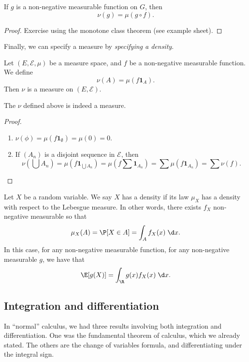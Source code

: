 \documentclass[a4paper]{article}
\begin{document}
\begin{prop}
  If $g$ is a non-negative measurable function on $G$, then
  \[
    \nu(g) = \mu(g \circ f).
  \]
\end{prop}

\begin{proof}
  Exercise using the monotone class theorem (see example sheet).
\end{proof}

Finally, we can specify a measure by \emph{specifying a density}.
\begin{defi}[Density]
  Let $(E, \mathcal{E}, \mu)$ be a measure space, and $f$ be a non-negative measurable function. We define
  \[
    \nu(A) = \mu(f \mathbf{1}_A)
  .\]
  Then $\nu$ is a measure on $(E, \mathcal{E})$.
\end{defi}

\begin{prop}
  The $\nu$ defined above is indeed a measure.
\end{prop}

\begin{proof}\leavevmode
  \begin{enumerate}
    \item $\nu(\phi) = \mu(f\mathbf{1}_\emptyset) = \mu(0) = 0$.
    \item If $(A_n)$ is a disjoint sequence in $\mathcal{E}$, then
      \[
        \nu\left(\bigcup A_n\right) = \mu(f\mathbf{1}_{\bigcup A_n}) = \mu\left(f \sum\mathbf{1}_{A_n}\right) = \sum \mu\left(f \mathbf{1}_{A_n}\right) = \sum \nu(f).
      \]
  \end{enumerate}
\end{proof}

\begin{defi}[Density]
  Let $X$ be a random variable. We say $X$ has a density if its law $\mu_X$ has a density with respect to the Lebesgue measure. In other words, there exists $f_X$ non-negative measurable so that
  \[
    \mu_X(A) = \P[X \in A] = \int_A f_X(x)\;\d x.
  \]
  In this case, for any non-negative measurable function, for any non-negative measurable $g$, we have that
  \[
    \E[g(X)] = \int_\R g(x) f_X(x) \;\d x.
  \]
\end{defi}

\subsection{Integration and differentiation}
In ``normal'' calculus, we had three results involving both integration and differentiation. One was the fundamental theorem of calculus, which we already stated. The others are the change of variables formula, and differentiating under the integral sign.
\end{document}
